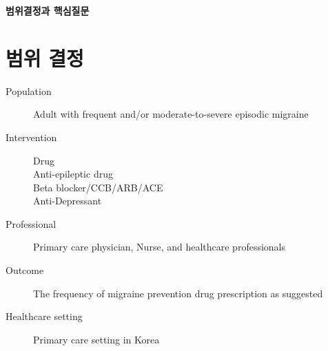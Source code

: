 \documentclass{paper}
\begin{document}
\Large \textbf{범위결정과 핵심질문} \normalsize

\section{범위 결정}
\begin{description}
	\item[Population] Adult with frequent and/or moderate-to-severe episodic migraine 
	\item[Intervention] Drug \\Anti-epileptic drug\\Beta blocker/CCB/ARB/ACE\\Anti-Depressant
	\item[Professional] Primary care physician, Nurse, and healthcare professionals
	\item[Outcome] The frequency of migraine prevention drug prescription as suggested
	\item[Healthcare setting] Primary care setting in Korea
\end{description}

\newpage
\end{document}
